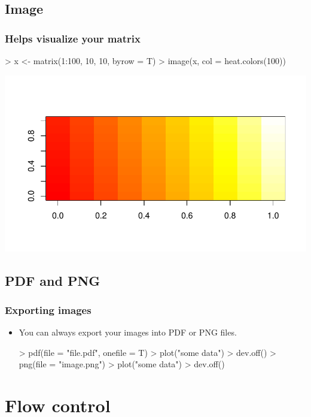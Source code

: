 \subsection{Image}

\begin{frame}
  \frametitle{Helps visualize your matrix}
\begin{Schunk}
\begin{Sinput}
> x <- matrix(1:100, 10, 10, byrow = T)
> image(x, col = heat.colors(100))
\end{Sinput}
\end{Schunk}
\includegraphics{plots/fig-031}
\end{frame}

\subsection{PDF and PNG}

\begin{frame}
  \frametitle{Exporting images}
  \begin{itemize}
  \item You can always export your images into PDF or PNG files.
\begin{Schunk}
\begin{Sinput}
> pdf(file = "file.pdf", onefile = T)
> plot("some data")
> dev.off()
> png(file = "image.png")
> plot("some data")
> dev.off()
\end{Sinput}
\end{Schunk}
  \end{itemize}
\end{frame}


\section{Flow control}

